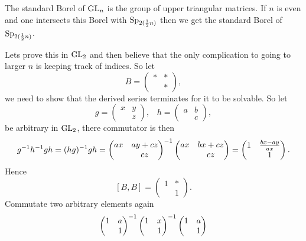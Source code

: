     \begin{example}
        The standard Borel of \(\operatorname{GL}_n\) is the group of upper triangular matrices. If \(n\) is even and one intersects this Borel with \(\operatorname{Sp}_{2(\frac{1}{2}n)}\) then we get the standard Borel of \(\operatorname{Sp}_{2(\frac{1}{2}n)}\).

        Lets prove this in \(\operatorname{GL}_2\) and then believe that the only complication to going to larger \(n\) is keeping track of indices. So let 
        \[B = \begin{pmatrix}
            \ast & \ast \\
             & \ast
        \end{pmatrix},\]
        we need to show that the derived series terminates for it to be solvable. So let 
        \[g = \begin{pmatrix}
            x & y\\
             & z
        \end{pmatrix}, \;\;\; h = \begin{pmatrix}
            a & b \\
            & c
        \end{pmatrix},\]
        be arbitrary in \(\operatorname{GL}_2\), there commutator is then 
        \[g^{-1} h^{-1} gh = (hg)^{-1} gh = \begin{pmatrix}
        ax & ay + cz \\ & cz
        \end{pmatrix}^{-1} \begin{pmatrix}
            ax & bx + cz\\ & cz
        \end{pmatrix} = \begin{pmatrix}
            1 & \frac{bx - ay}{ax} \\ & 1
        \end{pmatrix} .\]
        Hence
        \[[B, B] = \begin{pmatrix}
            1 & \ast \\ & 1
        \end{pmatrix}.\]
        Commutate two arbitrary elements again 
        \[\begin{pmatrix}
            1 & a \\ & 1
        \end{pmatrix}^{-1}\begin{pmatrix}
            1 & x \\ & 1
        \end{pmatrix}^{-1} \begin{pmatrix}
            1 & a \\ & 1

\end{pmatrix}\]
\end{example}
